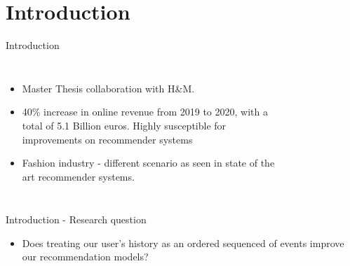 \documentclass{beamer}
\begin{document}
\section{Introduction} %
\begin{frame}{Introduction}
\begin{columns}[c] %

\begin{itemize}
\item Master Thesis collaboration with H\&M.
\item 40\% increase in online revenue from 2019 to 2020, with a total of 5.1 Billion euros. Highly susceptible for improvements on recommender systems
\item Fashion industry - different scenario as seen in state of the art recommender systems.
\end{itemize}

\begin{figure}%
    \centering
\end{figure}
\end{columns}
\end{frame}

\begin{frame}{Introduction - Research question}

\begin{itemize}
\item Does treating our user's history as an ordered sequenced of events improve our recommendation models?
\end{itemize}
\end{frame}
\end{document}

